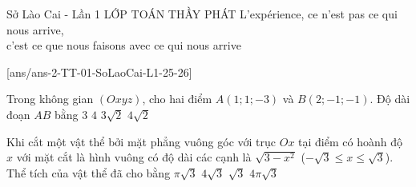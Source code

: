 \begin{name}
	{\tenchude}
	{Sở Lào Cai - Lần 1}
	{LỚP TOÁN THẦY PHÁT}
	{{L’expérience, ce n’est pas ce qui nous arrive,\\ c’est ce que nous faisons avec ce qui nous arrive}}
\end{name}
\setcounter{ex}{0}
[ans/ans-2-TT-01-SoLaoCai-L1-25-26]
\TN
\begin{ex}%
	Trong không gian $(Oxyz)$, cho hai điểm $A(1;1;-3)$ và $B(2;-1;-1)$. Độ dài đoạn $AB$ bằng
	\choice
	{\True $3$} 
	{$4$} 
	{$3\sqrt{2}$} 
	{$4\sqrt{2}$} 
\end{ex}

\begin{ex}%
	Khi cắt một vật thể bởi mặt phẳng vuông góc với trục $Ox$ tại điểm có hoành độ $x$ với mặt cắt là hình vuông có độ dài các cạnh là $\sqrt{3-x^2}$ ($-\sqrt{3} \le x \le \sqrt{3}$). Thể tích của vật thể đã cho bằng
	\choice
	{$\pi\sqrt{3}$}
	{\True $4\sqrt{3}$}
	{$\sqrt{3}$}
	{$4\pi\sqrt{3}$}
\end{ex}

